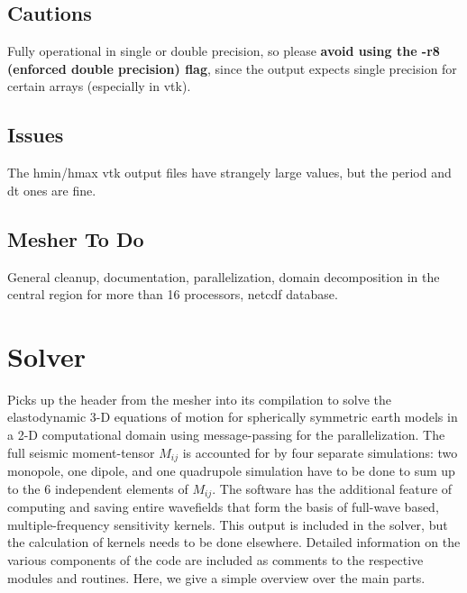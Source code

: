 \documentclass[11pt,letter,fleqn,english,notitlepage]{article}
\begin{document}
\subsection{Cautions}
Fully operational in single or double precision, so please 
\textbf{avoid using the -r8 (enforced double precision) flag}, 
since the output expects single precision for certain arrays (especially in vtk).

\subsection{Issues}
The hmin/hmax vtk output files have strangely large values, but the period and dt ones are fine.

\subsection{Mesher To Do}
General cleanup, documentation, parallelization, domain decomposition in the central region for 
more than 16 processors, netcdf database.

\newpage
\section{Solver}
Picks up the header from the mesher into its compilation to solve 
the elastodynamic 3-D equations of motion for spherically symmetric 
earth models in a 2-D computational domain using message-passing for the 
parallelization. The full seismic moment-tensor $M_{ij}$ is accounted for by four
separate simulations: two monopole, one dipole, and one quadrupole 
simulation have to be done to sum up to the 6 independent elements of $M_{ij}$.
The software has the additional feature of computing and 
saving entire wavefields that form the basis of full-wave based, 
multiple-frequency sensitivity kernels. This output is included in the 
solver, but the calculation of kernels needs to be done elsewhere. 
Detailed information on the various components of the code are included as 
comments to the respective modules and routines. 
Here, we give a simple overview over the main parts. 
\newpage
\end{document}
